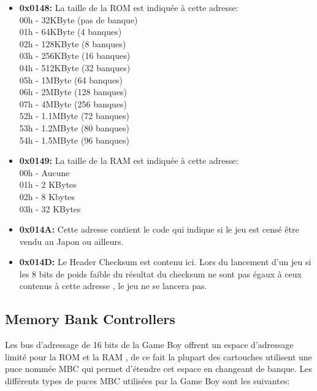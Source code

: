 \documentclass{report}
\begin{document}
\begin{itemize}
\item \textbf{0x0148:} La taille de la ROM est indiquée à cette adresse:
\\00h -  32KByte (pas de banque)
\\01h -  64KByte (4 banques)
\\02h - 128KByte (8 banques)
\\03h - 256KByte (16 banques)
\\04h - 512KByte (32 banques)
\\05h -   1MByte (64 banques)
\\06h -   2MByte (128 banques)
\\07h -   4MByte (256 banques)
\\52h - 1.1MByte (72 banques)
\\53h - 1.2MByte (80 banques)
\\54h - 1.5MByte (96 banques)\\

\item \textbf{0x0149:} La taille de la RAM est indiquée à cette adresse:
\\00h - Aucune
\\01h - 2 KBytes
\\02h - 8 Kbytes
\\03h - 32 KBytes\\

\item \textbf{0x014A:} Cette adresse contient le code qui indique si le jeu est censé être vendu au Japon ou ailleurs.\\

\item \textbf{0x014D:} Le Header Checksum est contenu ici. Lors du lancement d'un jeu si les 8 bits de poids faible du résultat du checksum ne sont pas égaux à ceux contenus à cette adresse , le jeu ne se lancera pas.\\

\end{itemize}

\subsection{Memory Bank Controllers}
Les bus d'adressage de 16 bits de la Game Boy offrent un espace d'adressage limité pour la ROM et la RAM , de ce fait la plupart des cartouches utilisent une puce nommée MBC qui permet d'étendre cet espace en changeant de banque. Les différents types de puces MBC utilisées par la Game Boy sont les suivantes:\\
\end{document}
